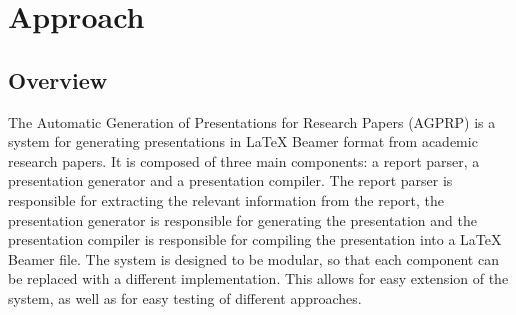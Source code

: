 \chapter{Approach}
\label{ch:approach}


\section{Overview}

The Automatic Generation of Presentations for Research Papers (AGPRP) is a system for generating presentations in \LaTeX{} Beamer format from academic research papers. It is composed of three main components: a report parser, a presentation generator and a presentation compiler. The report parser is responsible for extracting the relevant information from the report, the presentation generator is responsible for generating the presentation and the presentation compiler is responsible for compiling the presentation into a \LaTeX{} Beamer file. The system is designed to be modular, so that each component can be replaced with a different implementation. This allows for easy extension of the system, as well as for easy testing of different approaches.

%
